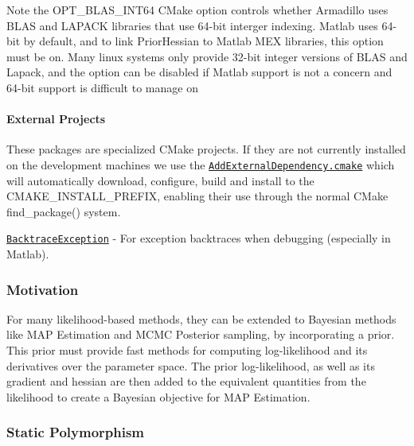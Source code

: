 Note the {\ttfamily O\+P\+T\+\_\+\+B\+L\+A\+S\+\_\+\+I\+N\+T64} C\+Make option controls whether Armadillo uses B\+L\+AS and L\+A\+P\+A\+CK libraries that use 64-\/bit interger indexing. Matlab uses 64-\/bit by default, and to link Prior\+Hessian to Matlab M\+EX libraries, this option must be on. Many linux systems only provide 32-\/bit integer versions of B\+L\+AS and Lapack, and the option can be disabled if Matlab support is not a concern and 64-\/bit support is difficult to manage on

\paragraph*{External Projects}

These packages are specialized C\+Make projects. If they are not currently installed on the development machines we use the \href{https://github.com/markjolah/UncommonCMakeModules/blob/master/AddExternalDependency.cmake}{\tt Add\+External\+Dependency.\+cmake} which will automatically download, configure, build and install to the {\ttfamily C\+M\+A\+K\+E\+\_\+\+I\+N\+S\+T\+A\+L\+L\+\_\+\+P\+R\+E\+F\+IX}, enabling their use through the normal C\+Make {\ttfamily find\+\_\+package()} system.


\begin{DoxyItemize}
\item \href{https://github.com/markjolah/BacktraceException}{\tt Backtrace\+Exception} -\/ For exception backtraces when debugging (especially in Matlab).
\end{DoxyItemize}

\subsubsection*{Motivation}

For many likelihood-\/based methods, they can be extended to Bayesian methods like M\+AP Estimation and M\+C\+MC Posterior sampling, by incorporating a prior. This prior must provide fast methods for computing log-\/likelihood and it\textquotesingle{}s derivatives over the parameter space. The prior log-\/likelihood, as well as it\textquotesingle{}s gradient and hessian are then added to the equivalent quantities from the likelihood to create a Bayesian objective for M\+AP Estimation.

\subsubsection*{Static Polymorphism}

